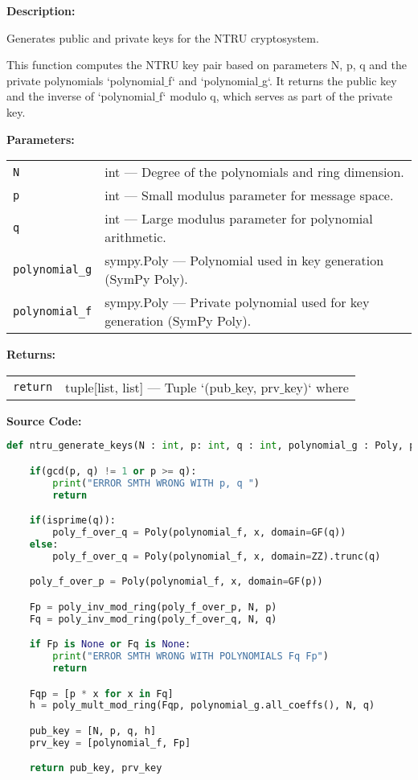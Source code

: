 \documentclass[a4paper,12pt]{article}
\begin{document}
\textbf{Description:}

Generates public and private keys for the NTRU cryptosystem.

This function computes the NTRU key pair based on parameters N, p, q and the
private polynomials `polynomial$\_$f` and `polynomial$\_$g`. It returns the public key
and the inverse of `polynomial$\_$f` modulo q, which serves as part of the private key.

\vspace{1em}
\textbf{Parameters:}

\vspace{1em}
\noindent
\begin{tabular}{p{3cm} p{11cm}}
\texttt{N} & int — Degree of the polynomials and ring dimension. \\
\texttt{p} & int — Small modulus parameter for message space. \\
\texttt{q} & int — Large modulus parameter for polynomial arithmetic. \\
\texttt{polynomial\_g} & sympy.Poly — Polynomial used in key generation (SymPy Poly). \\
\texttt{polynomial\_f} & sympy.Poly — Private polynomial used for key generation (SymPy Poly). \\
\end{tabular}

\vspace{1em}
\noindent
\textbf{Returns:}

\begin{tabular}{p{3cm} p{11cm}}
\texttt{return} & tuple[list, list] — Tuple `(pub$\_$key, prv$\_$key)` where \\
\end{tabular}

\vspace{1em}
\textbf{Source Code:}

\begin{lstlisting}[language=Python]
def ntru_generate_keys(N : int, p: int, q : int, polynomial_g : Poly, polynomial_f : Poly):

    if(gcd(p, q) != 1 or p >= q):
        print("ERROR SMTH WRONG WITH p, q ")
        return

    if(isprime(q)):
        poly_f_over_q = Poly(polynomial_f, x, domain=GF(q))
    else:
        poly_f_over_q = Poly(polynomial_f, x, domain=ZZ).trunc(q)

    poly_f_over_p = Poly(polynomial_f, x, domain=GF(p))

    Fp = poly_inv_mod_ring(poly_f_over_p, N, p)
    Fq = poly_inv_mod_ring(poly_f_over_q, N, q)

    if Fp is None or Fq is None:
        print("ERROR SMTH WRONG WITH POLYNOMIALS Fq Fp")
        return

    Fqp = [p * x for x in Fq]
    h = poly_mult_mod_ring(Fqp, polynomial_g.all_coeffs(), N, q)

    pub_key = [N, p, q, h]
    prv_key = [polynomial_f, Fp]

    return pub_key, prv_key
\end{lstlisting}
\end{document}
